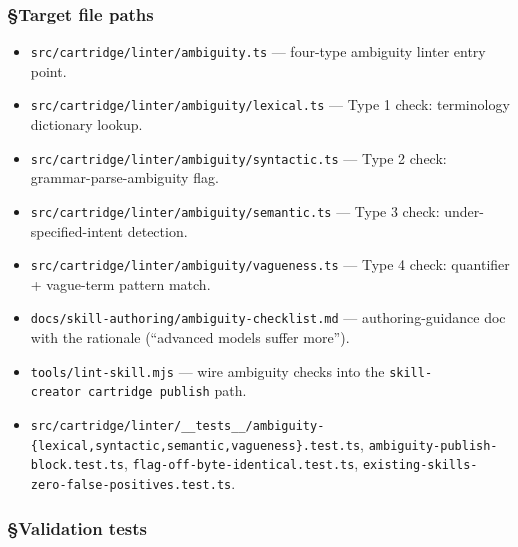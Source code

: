 \documentclass[11pt,letterpaper]{article}
\providecommand{\tightlist}{\setlength{\itemsep}{0pt}\setlength{\parskip}{0pt}}
\begin{document}
\subsubsection{§Target file paths}

\begin{itemize}
\tightlist
\item
  \texttt{src/cartridge/linter/ambiguity.ts} --- four-type ambiguity
  linter entry point.
\item
  \texttt{src/cartridge/linter/ambiguity/lexical.ts} --- Type 1 check:
  terminology dictionary lookup.
\item
  \texttt{src/cartridge/linter/ambiguity/syntactic.ts} --- Type 2 check:
  grammar-parse-ambiguity flag.
\item
  \texttt{src/cartridge/linter/ambiguity/semantic.ts} --- Type 3 check:
  under-specified-intent detection.
\item
  \texttt{src/cartridge/linter/ambiguity/vagueness.ts} --- Type 4 check:
  quantifier + vague-term pattern match.
\item
  \texttt{docs/skill-authoring/ambiguity-checklist.md} ---
  authoring-guidance doc with the rationale (``advanced models suffer
  more'').
\item
  \texttt{tools/lint-skill.mjs} --- wire ambiguity checks into the
  \texttt{skill-creator\ cartridge\ publish} path.
\item
  \texttt{src/cartridge/linter/\_\_tests\_\_/ambiguity-\{lexical,syntactic,semantic,vagueness\}.test.ts},
  \texttt{ambiguity-publish-block.test.ts},
  \texttt{flag-off-byte-identical.test.ts},
  \texttt{existing-skills-zero-false-positives.test.ts}.
\end{itemize}

\subsubsection{§Validation tests}
\end{document}
